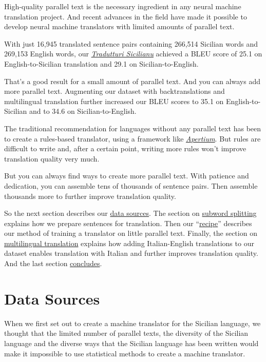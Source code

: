 \documentclass[10pt,letterpaper]{article}
\begin{document}
High-quality parallel text is the necessary ingredient in any neural machine translation project.
And recent advances in the field have made it possible to develop neural machine translators with
limited amounts of parallel text.

With just 16,945 translated sentence pairs containing 266,514 Sicilian words and 269,153 English words,
our \href{https://translate.napizia.com/}{\textit{Tradutturi Sicilianu}}
achieved a BLEU score of 25.1 on English-to-Sicilian translation and 29.1 on Sicilian-to-English.
      
That's a good result for a small amount of parallel text.  And you can always add more parallel text.
Augmenting our dataset with backtranslations and multilingual translation further increased our
BLEU scores to 35.1 on English-to-Sicilian and to 34.6 on Sicilian-to-English.

The traditional recommendation for languages without any parallel text has been to create
a rules-based translator, using a framework like
\href{https://www.apertium.org/}{\textit{Apertium}}.
But rules are difficult to write and, after a certain point,
writing more rules won't improve translation quality very much.

But you can always find ways to create more parallel text.
With patience and dedication, you can assemble tens of thousands of sentence pairs.
Then assemble thousands more to further improve translation quality.

So the next section describes our \hyperlink{data}{data sources}.  The section on
\hyperlink{subword}{subword splitting} explains how we prepare sentences for translation.
Then our ``\hyperlink{recipe}{recipe}'' describes our method of training a translator on little parallel text.
Finally, the section on \hyperlink{multilingual}{multilingual translation} explains how adding Italian-English
translations to our dataset enables translation with Italian and further improves translation quality.
And the last section \hyperlink{conclusion}{concludes}.



\hypertarget{data}{}

\section*{Data Sources}

When we first set out to create a machine translator for the Sicilian language,
we thought that the limited number of parallel texts, the diversity of the Sicilian
language and the diverse ways that the Sicilian language has been written would make
it impossible to use statistical methods to create a machine translator.
\end{document}
